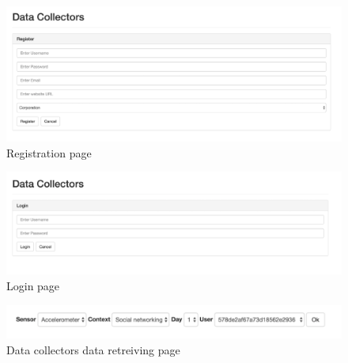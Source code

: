 
\begin{figure}[ht!]
\centering
\includegraphics[width=\textwidth,keepaspectratio]{./images/fds_dc_register1}
\caption{Registration page\label{fig:fdsdcregister}}
\end{figure}

\begin{figure}[ht!]
\centering
\includegraphics[width=\textwidth,keepaspectratio]{./images/fds_dc_login1}
\caption{Login page\label{fig:fdsdclogin}}
\end{figure}

\begin{figure}[ht!]
\centering
\includegraphics[width=\textwidth,keepaspectratio]{./images/fds_dc_welcome1}
\caption{Data collectors data retreiving page \label{fig:fds5}}
\end{figure}






